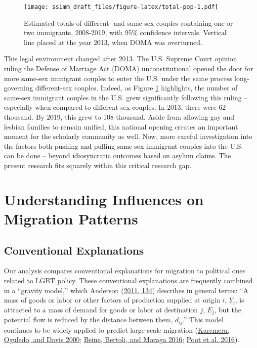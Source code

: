 \documentclass[
  11pt,
]{article}
\begin{document}
\begin{figure}
\centering
\texttt{[image: ssimm\_draft\_files/figure-latex/total-pop-1.pdf]}
\caption{\label{fig:total-pop}Estimated totals of different- and same-sex couples containing one or two immigrants, 2008-2019, with 95\% confidence intervals. Vertical line placed at the year 2013, when DOMA was overturned.}
\end{figure}

This legal environment changed after 2013. The U.S. Supreme Court opinion ruling the Defense of Marriage Act (DOMA) unconstitutional opened the door for more same-sex immigrant couples to enter the U.S. under the same process long-governing different-sex couples. Indeed, as Figure \ref{fig:total-pop} highlights, the number of same-sex immigrant couples in the U.S. grew significantly following this ruling -- especially when compared to different-sex couples. In 2013, there were 62 thousand. By 2019, this grew to 108 thousand. Aside from allowing gay and lesbian families to remain unified, this national opening creates an important moment for the scholarly community as well. Now, more careful investigation into the factors both pushing and pulling same-sex immigrant couples into the U.S. can be done -- beyond idiosyncratic outcomes based on asylum claims. The present research fits squarely within this critical research gap.

\hypertarget{understanding-influences-on-migration-patterns}{%
\section{Understanding Influences on Migration Patterns}\label{understanding-influences-on-migration-patterns}}

\hypertarget{conventional-explanations}{%
\subsection{Conventional Explanations}\label{conventional-explanations}}

Our analysis compares conventional explanations for migration to political ones related to LGBT policy. These conventional explanations are frequently combined in a ``gravity model,'' which Anderson (\protect\hyperlink{ref-anderson_2011}{2011, 134}) describes in general terms: ``A mass of goods or labor or other factors of production supplied at origin \(i\), \(Y_i\), is attracted to a mass of demand for goods or labor at destination \(j\), \(E_j\), but the potential flow is reduced by the distance between them, \(d_{ij}\).'' This model continues to be widely applied to predict large-scale migration (\protect\hyperlink{ref-karemera_2000}{Karemera, Oguledo, and Davis 2000}; \protect\hyperlink{ref-beine_2016}{Beine, Bertoli, and Moraga 2016}; \protect\hyperlink{ref-poot_2016}{Poot et al. 2016}).
\end{document}
